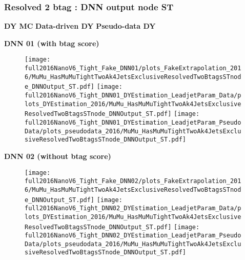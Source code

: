 \documentclass[9pt]{beamer}
\begin{document}
\begin{frame}
	\frametitle{Resolved 2 btag : DNN output node ST}
    \hspace{2cm} \textbf{DY MC} \hspace{1.9cm} \textbf{Data-driven DY} \hspace{1cm} \textbf{Pseudo-data DY}
    \begin{center}
        \textbf{DNN 01 (with btag score)}
    \end{center}
	\begin{figure}
		\texttt{[image: full2016NanoV6\_Tight\_Fake\_DNN01/plots\_FakeExtrapolation\_2016/MuMu\_HasMuMuTightTwoAk4JetsExclusiveResolvedTwoBtagsSTnode\_DNNOutput\_ST.pdf]}
		\texttt{[image: full2016NanoV6\_Tight\_DNN01\_DYEstimation\_LeadjetParam\_Data/plots\_DYEstimation\_2016/MuMu\_HasMuMuTightTwoAk4JetsExclusiveResolvedTwoBtagsSTnode\_DNNOutput\_ST.pdf]}
		\texttt{[image: full2016NanoV6\_Tight\_DNN01\_DYEstimation\_LeadjetParam\_PseudoData/plots\_pseudodata\_2016/MuMu\_HasMuMuTightTwoAk4JetsExclusiveResolvedTwoBtagsSTnode\_DNNOutput\_ST.pdf]}
	\end{figure}
    \begin{center}
        \textbf{DNN 02 (without btag score)}
    \end{center}
	\begin{figure}
		\texttt{[image: full2016NanoV6\_Tight\_Fake\_DNN02/plots\_FakeExtrapolation\_2016/MuMu\_HasMuMuTightTwoAk4JetsExclusiveResolvedTwoBtagsSTnode\_DNNOutput\_ST.pdf]}
		\texttt{[image: full2016NanoV6\_Tight\_DNN02\_DYEstimation\_LeadjetParam\_Data/plots\_DYEstimation\_2016/MuMu\_HasMuMuTightTwoAk4JetsExclusiveResolvedTwoBtagsSTnode\_DNNOutput\_ST.pdf]}
		\texttt{[image: full2016NanoV6\_Tight\_DNN02\_DYEstimation\_LeadjetParam\_PseudoData/plots\_pseudodata\_2016/MuMu\_HasMuMuTightTwoAk4JetsExclusiveResolvedTwoBtagsSTnode\_DNNOutput\_ST.pdf]}
	\end{figure}
\end{frame}
\end{document}
